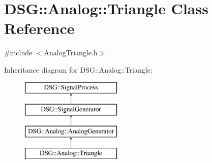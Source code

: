 \hypertarget{classDSG_1_1Analog_1_1Triangle}{\section{D\-S\-G\-:\-:Analog\-:\-:Triangle Class Reference}
\label{classDSG_1_1Analog_1_1Triangle}
}


{\ttfamily \#include $<$Analog\-Triangle.\-h$>$}

Inheritance diagram for D\-S\-G\-:\-:Analog\-:\-:Triangle\-:\begin{figure}[H]
\begin{center}
\leavevmode
\includegraphics[height=4.000000cm]{classDSG_1_1Analog_1_1Triangle}
\end{center}
\end{figure}
